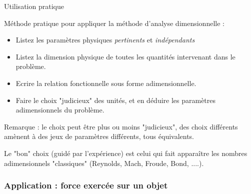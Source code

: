 \begin{frame}{Utilisation pratique}

\small
Méthode pratique pour appliquer la méthode d'analyse dimensionnelle :

\bigskip
\begin{itemize}
\item Listez les paramètres physiques {\em pertinents } et {\em indépendants }

\item Listez la dimension physique de toutes les quantités intervenant dans le problème.

\item Ecrire la relation fonctionnelle sous forme adimensionnelle.

\item Faire le choix "judicieux" des unités, et en déduire les paramètres adimensionnels du problème.

\end{itemize}

\bigskip

Remarque : le choix peut être plus ou moins "judicieux", des choix différents amènent à des jeux de paramètres différents, tous équivalents.  

\medskip 

Le "bon" choix (guidé par l'expérience) est celui qui fait apparaître les nombres adimensionnels "classiques" (Reynolds, Mach, Froude, Bond, ....).

\end{frame}




\subsubsection{Application : force exercée sur un objet}


